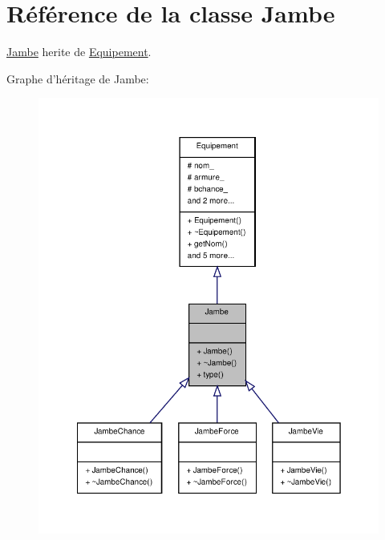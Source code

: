 \hypertarget{class_jambe}{\section{Référence de la classe Jambe}
\label{class_jambe}
}


\hyperlink{class_jambe}{Jambe} herite de \hyperlink{class_equipement}{Equipement}.  




Graphe d'héritage de Jambe\-:
\nopagebreak
\begin{figure}[H]
\begin{center}
\leavevmode
\includegraphics[width=348pt]{class_jambe__inherit__graph}
\end{center}
\end{figure}


